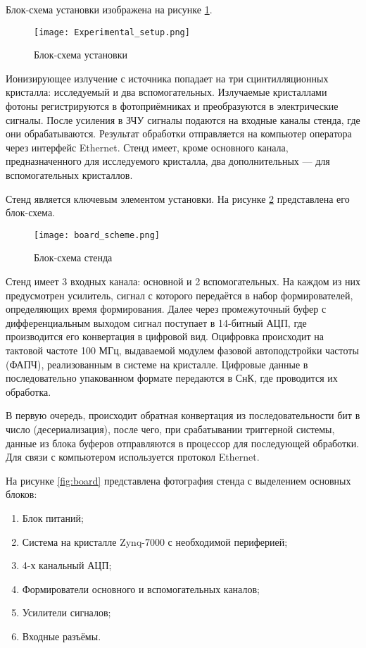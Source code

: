 Блок-схема установки изображена на рисунке \ref{fig:exp_setup}.\par
\begin{figure}[ht]
    \centering
    \texttt{[image: Experimental\_setup.png]}
    \caption{Блок-схема установки}
    \label{fig:exp_setup}
\end{figure}
Ионизирующее излучение с источника попадает на три сцинтилляционных кристалла: исследуемый и два вспомогательных. Излучаемые кристаллами фотоны регистрируются в фотоприёмниках и преобразуются в электрические сигналы. После усиления в ЗЧУ сигналы подаются на входные каналы стенда, где они обрабатываются. Результат обработки отправляется на компьютер оператора через интерфейс Ethernet. Стенд имеет, кроме основного канала, предназначенного для исследуемого кристалла, два дополнительных --- для вспомогательных кристаллов.\par
Стенд является ключевым элементом установки. На рисунке \ref{fig:board_scheme} представлена его блок-схема.\par
\begin{figure}[ht]
    \centering
    \texttt{[image: board\_scheme.png]}
    \caption{Блок-схема стенда}
    \label{fig:board_scheme}
\end{figure}
Стенд имеет 3 входных канала: основной и 2 вспомогательных. На каждом из них предусмотрен усилитель, сигнал с которого передаётся в набор формирователей, определяющих время формирования. Далее через промежуточный буфер с дифференциальным выходом сигнал поступает в 14-битный АЦП, где производится его конвертация в цифровой вид. Оцифровка происходит на тактовой частоте 100 МГц, выдаваемой модулем фазовой автоподстройки частоты (ФАПЧ), реализованным в системе на кристалле. Цифровые данные в последовательно упакованном формате передаются в СнК, где проводится их обработка.\par
В первую очередь, происходит обратная конвертация из последовательности бит в число (десериализация), после чего, при срабатывании триггерной системы, данные из блока буферов отправляются в процессор для последующей обработки. Для связи с компьютером используется протокол Ethernet.\par
На рисунке \ref{fig:board} представлена фотография стенда с выделением основных блоков:\par
\begin{enumerate}
    \item Блок питаний;
    \item Система на кристалле Zynq-7000 с необходимой периферией;
    \item 4-х канальный АЦП;
    \item Формирователи основного и вспомогательных каналов;
    \item Усилители сигналов;
    \item Входные разъёмы. 
\end{enumerate}

